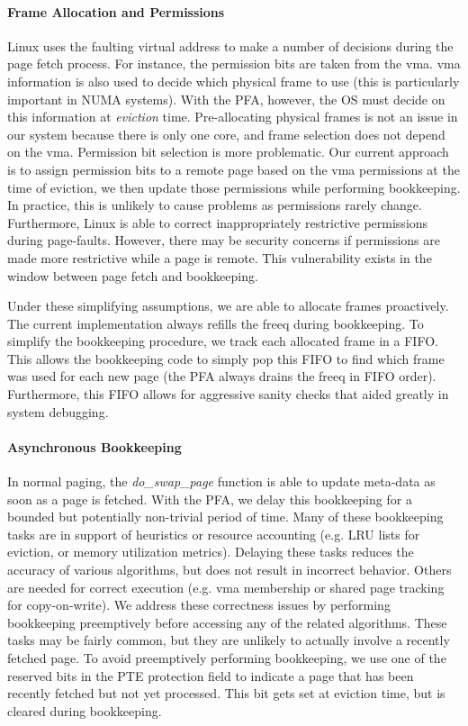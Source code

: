 \paragraph{Frame Allocation and Permissions}
Linux uses the faulting virtual address to make a number of decisions during
the page fetch process. For instance, the permission bits are taken from the
\gls{vma}. \gls{vma} information is also used to decide which physical frame to
use (this is particularly important in NUMA systems). With the PFA, however,
the OS must decide on this information at \emph{eviction} time. Pre-allocating
physical frames is not an issue in our system because there is only one core,
and frame selection does not depend on the \gls{vma}. Permission bit selection
is more problematic. Our current approach is to assign permission bits to a
remote page based on the \gls{vma} permissions at the time of eviction, we then
update those permissions while performing bookkeeping. In practice, this is
unlikely to cause problems as permissions rarely change. Furthermore, Linux is
able to correct inappropriately restrictive permissions during page-faults.
However, there may be security concerns if permissions are made more
restrictive while a page is remote. This vulnerability exists in the window
between page fetch and bookkeeping.

Under these simplifying assumptions, we are able to allocate frames
proactively. The current implementation always refills the \gls{freeq} during
bookkeeping. To simplify the bookkeeping procedure, we track
each allocated frame in a FIFO. This allows the bookkeeping code to simply pop
this FIFO to find which frame was used for each new page (the PFA always drains
the \gls{freeq} in FIFO order). Furthermore, this FIFO allows for aggressive
sanity checks that aided greatly in system debugging.

\paragraph{Asynchronous Bookkeeping}
In normal paging, the \emph{do\_swap\_page} function is able to update meta-data as
soon as a page is fetched. With the PFA, we delay this bookkeeping for a
bounded but potentially non-trivial period of time. Many of these bookkeeping
tasks are in support of heuristics or resource accounting (e.g. LRU lists for
eviction, or memory utilization metrics). Delaying these tasks reduces the
accuracy of various algorithms, but does not result in incorrect behavior.
Others are needed for correct execution (e.g. \gls{vma} membership or shared
page tracking for copy-on-write). We address these correctness issues by
performing bookkeeping preemptively before accessing any of the related
algorithms. These tasks may be fairly common, but they are unlikely to actually
involve a recently fetched page. To avoid preemptively performing bookkeeping,
we use one of the reserved bits in the PTE protection field to indicate a page
that has been recently fetched but not yet processed. This bit gets set at
eviction time, but is cleared during bookkeeping.

